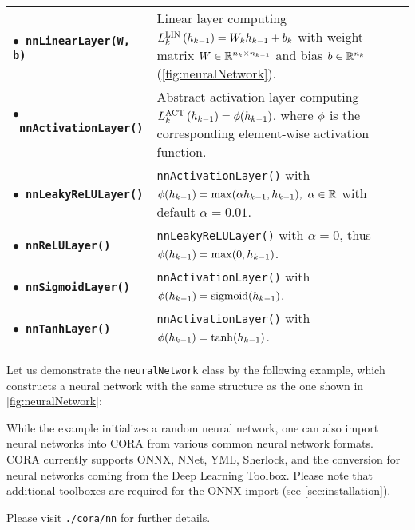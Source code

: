 \begin{center}
	\renewcommand{\arraystretch}{1.3}
	\begin{tabular}[t]{l p{11cm} }
		$\bullet$~\textbf{\texttt{nnLinearLayer(W, b)}} & Linear layer computing $L_{k}^\text{LIN}\left(h_{k-1}\right)=W_kh_{k-1} + b_k$ with weight matrix $W \in \mathbb{R}^{n_k \times n_{k-1}}$ and bias $b\in\mathbb{R}^{n_k}$ (\cref{fig:neuralNetwork}).\\
		$\bullet$~\textbf{\texttt{nnActivationLayer()}} & Abstract activation layer computing $L_{k}^\text{ACT}\left(h_{k-1}\right)=\phi(h_{k-1})$, where $\phi$ is the corresponding element-wise activation function. \\
		$\bullet$~\textbf{\texttt{nnLeakyReLULayer()}} & \texttt{nnActivationLayer()} with $\phi(h_{k-1}) = \max(\alpha h_{k-1}, h_{k-1}),\ \alpha\in\mathbb{R}$ with default $\alpha=0.01$. \\
		$\bullet$~\textbf{\texttt{nnReLULayer()}} & \texttt{nnLeakyReLULayer()} with $\alpha=0$, thus $\phi(h_{k-1}) = \max(0, h_{k-1})$. \\
		$\bullet$~\textbf{\texttt{nnSigmoidLayer()}} & \texttt{nnActivationLayer()} with $\phi(h_{k-1}) = \text{sigmoid}(h_{k-1})$. \\
		$\bullet$~\textbf{\texttt{nnTanhLayer()}} & \texttt{nnActivationLayer()} with $\phi(h_{k-1}) = \tanh(h_{k-1})$. \\
	\end{tabular}
\end{center}

Let us demonstrate the \texttt{neuralNetwork} class by the following example, which constructs a neural network with the same structure as the one shown in \cref{fig:neuralNetwork}:

\begin{center}
\begin{minipage}[t]{0.9\textwidth}
{\footnotesize  }
\end{minipage}
\end{center}

While the example initializes a random neural network, one can also import neural networks into CORA from various common neural network formats.
CORA currently supports ONNX, NNet, YML, Sherlock, and the conversion for neural networks coming from the Deep Learning Toolbox.
Please note that additional toolboxes are required for the ONNX import (see \cref{sec:installation}).

Please visit \texttt{./cora/nn} for further details.